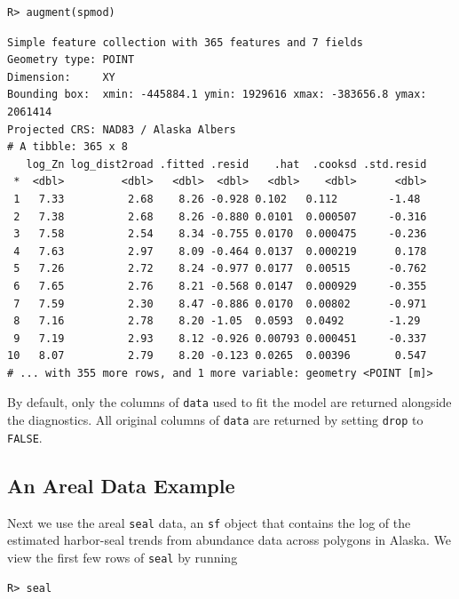 \documentclass{article}
\begin{document}
\begin{verbatim}
R> augment(spmod)
\end{verbatim}

\begin{verbatim}
Simple feature collection with 365 features and 7 fields
Geometry type: POINT
Dimension:     XY
Bounding box:  xmin: -445884.1 ymin: 1929616 xmax: -383656.8 ymax: 2061414
Projected CRS: NAD83 / Alaska Albers
# A tibble: 365 x 8
   log_Zn log_dist2road .fitted .resid    .hat  .cooksd .std.resid
 *  <dbl>         <dbl>   <dbl>  <dbl>   <dbl>    <dbl>      <dbl>
 1   7.33          2.68    8.26 -0.928 0.102   0.112        -1.48 
 2   7.38          2.68    8.26 -0.880 0.0101  0.000507     -0.316
 3   7.58          2.54    8.34 -0.755 0.0170  0.000475     -0.236
 4   7.63          2.97    8.09 -0.464 0.0137  0.000219      0.178
 5   7.26          2.72    8.24 -0.977 0.0177  0.00515      -0.762
 6   7.65          2.76    8.21 -0.568 0.0147  0.000929     -0.355
 7   7.59          2.30    8.47 -0.886 0.0170  0.00802      -0.971
 8   7.16          2.78    8.20 -1.05  0.0593  0.0492       -1.29 
 9   7.19          2.93    8.12 -0.926 0.00793 0.000451     -0.337
10   8.07          2.79    8.20 -0.123 0.0265  0.00396       0.547
# ... with 355 more rows, and 1 more variable: geometry <POINT [m]>
\end{verbatim}

By default, only the columns of \texttt{data} used to fit the model are
returned alongside the diagnostics. All original columns of
\texttt{data} are returned by setting \texttt{drop} to \texttt{FALSE}.

\hypertarget{an-areal-data-example}{%
\subsection{An Areal Data Example}\label{an-areal-data-example}}

Next we use the areal \texttt{seal} data, an \texttt{sf} object that
contains the log of the estimated harbor-seal trends from abundance data
across polygons in Alaska. We view the first few rows of \texttt{seal}
by running

\begin{verbatim}
R> seal
\end{verbatim}
\end{document}

